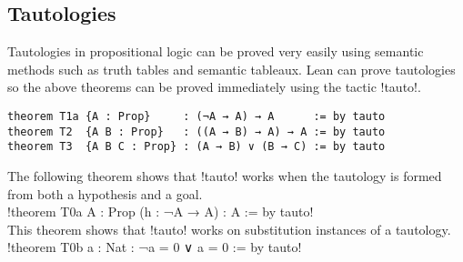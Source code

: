 \newpage

\subsection{Tautologies}

Tautologies in propositional logic can be proved very easily using semantic methods such as truth tables and semantic tableaux. Lean can prove tautologies so the above theorems can be proved immediately using the tactic !tauto!.

\begin{Verbatim}[numbers=none]
theorem T1a {A : Prop}     : (¬A → A) → A      := by tauto
theorem T2  {A B : Prop}   : ((A → B) → A) → A := by tauto
theorem T3  {A B C : Prop} : (A → B) ∨ (B → C) := by tauto
\end{Verbatim}
The following theorem shows that !tauto! works when the tautology is formed from both a hypothesis and a goal.\\
\indnt{}!theorem T0a {A : Prop} (h : ¬A → A) : A := by tauto!\\

This theorem shows that !tauto! works on substitution instances of a tautology.\\
\indnt{}!theorem T0b {a : Nat} : ¬a = 0 ∨ a = 0 := by tauto!
